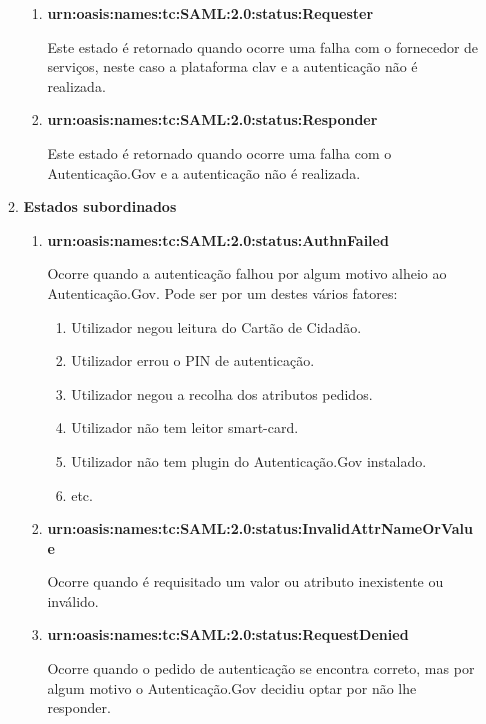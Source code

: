 \begin{enumerate}
\begin{enumerate}
\begin{enumerate}
            \item \textbf{urn:oasis:names:tc:SAML:2.0:status:Requester}
            
            Este estado é retornado quando ocorre uma falha com o fornecedor de serviços, neste caso a plataforma \gls{clav} e a autenticação não é realizada.
            
            \item \textbf{urn:oasis:names:tc:SAML:2.0:status:Responder}
            
            Este estado é retornado quando ocorre uma falha com o Autenticação.Gov e a autenticação não é realizada.
        \end{enumerate}
        
        \item \textbf{Estados subordinados}
        \begin{enumerate}
            \item \textbf{urn:oasis:names:tc:SAML:2.0:status:AuthnFailed}
            
            Ocorre quando a autenticação falhou por algum motivo alheio ao Autenticação.Gov.
            Pode ser por um destes vários fatores:
            
            \begin{enumerate}
                \item Utilizador negou leitura do Cartão de Cidadão.
                \item Utilizador errou o PIN de autenticação.
                \item Utilizador negou a recolha dos atributos pedidos.
                \item Utilizador não tem leitor smart-card.
                \item Utilizador não tem plugin do Autenticação.Gov instalado.
                \item etc.
            \end{enumerate}
            
            \item \textbf{urn:oasis:names:tc:SAML:2.0:status:InvalidAttrNameOrValue}
            
            Ocorre quando é requisitado um valor ou atributo inexistente ou inválido.
            
            \item \textbf{urn:oasis:names:tc:SAML:2.0:status:RequestDenied}
            
            Ocorre quando o pedido de autenticação se encontra correto, mas por algum motivo o Autenticação.Gov decidiu optar por não lhe responder.
            

\end{enumerate}
\end{enumerate}
\end{enumerate}
